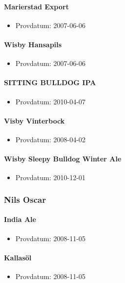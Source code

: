 \documentclass[11pt]{article}
\begin{document}
\paragraph{Marierstad Export}
\label{sec:org4234c8c}
\begin{itemize}
\item Provdatum: 2007-06-06
\end{itemize}
\paragraph{Wisby Hansapils}
\label{sec:orgba9a5c4}
\begin{itemize}
\item Provdatum: 2007-06-06
\end{itemize}
\paragraph{SITTING BULLDOG IPA}
\label{sec:org57be67e}
\begin{itemize}
\item Provdatum: 2010-04-07
\end{itemize}
\paragraph{Visby Vinterbock}
\label{sec:orgbf5b4b5}
\begin{itemize}
\item Provdatum: 2008-04-02
\end{itemize}
\paragraph{Wisby Sleepy Bulldog Winter Ale}
\label{sec:org0e68bfb}
\begin{itemize}
\item Provdatum: 2010-12-01
\end{itemize}
\subsubsection{Nils Oscar}
\label{sec:org5314315}
\paragraph{India Ale}
\label{sec:org6928336}
\begin{itemize}
\item Provdatum: 2008-11-05
\end{itemize}
\paragraph{Kallasöl}
\label{sec:org4cf01d8}
\begin{itemize}
\item Provdatum: 2008-11-05
\end{itemize}
\end{document}
